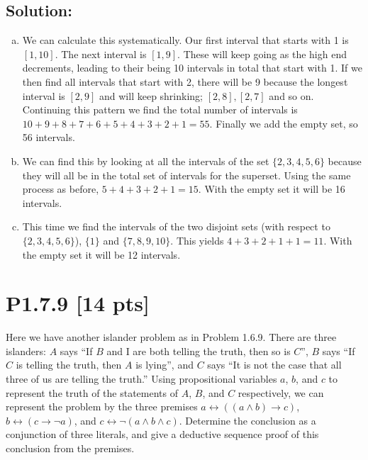 \documentclass[12pt]{article}
\begin{document}
\subsection*{\textbf{Solution:}}
\begin{enumerate}[(a)]
    \item We can calculate this systematically. Our first interval that starts with 1 is $[1, 10]$. The next interval is $[1, 9]$. These will keep going as the high end decrements, leading to their being 10 intervals in total that start with 1. 
				If we then find all intervals that start with 2, there will be 9 because the longest interval is $[2, 9]$ and will keep shrinking; $[2, 8], [2, 7]$ and so on. Continuing this pattern we find the total number of intervals is $10+9+8+7+6+5+4+3+2+1=55$. Finally we add the empty set, so 56 intervals.

    \item We can find this by looking at all the intervals of the set $\{2, 3, 4, 5, 6\}$ because they will all be in the total set of intervals for the superset. Using the same process as before, $5+4+3+2+1=15$. With the empty set it will be 16 intervals.

    \item This time we find the intervals of the two disjoint sets (with respect to $\{2, 3, 4, 5, 6\}$), $\{1\}$ and $\{7, 8, 9, 10\}$. This yields $4+3+2+1+1=11$. With the empty set it will be 12 intervals.

\end{enumerate}


\newpage



\newpage
\section*{\textbf{P1.7.9} [14 pts]}
Here we have another islander problem as in Problem 1.6.9. There are three islanders: $A$ says “If $B$ and I are both telling the truth, then so is $C$”, $B$ says “If $C$ is telling the truth, then $A$ is lying”, and $C$ says “It is not the case that all three of us are telling the truth.” Using propositional variables $a$, $b$, and $c$ to represent the truth of the statements of $A$, $B$, and $C$ respectively, we can represent the problem by the three premises $a \leftrightarrow ((a \wedge b) \rightarrow c)$, $b \leftrightarrow (c \rightarrow \neg a)$, and $c \leftrightarrow \neg(a \wedge b \wedge c)$. Determine the conclusion as a conjunction of three literals, and give a deductive sequence proof of this conclusion from the premises.
\end{document}
